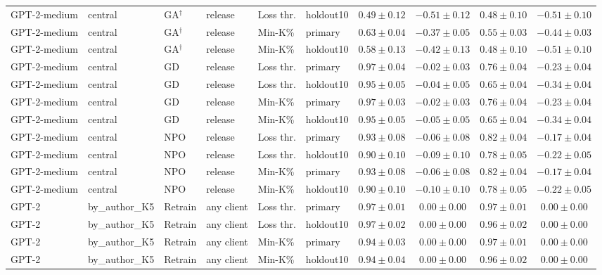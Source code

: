 {\begin{longtable}{@{\extracolsep{\fill}}llllllcccc@{}}
GPT-2-medium & central & GA$^{\dagger}$ & release & Loss thr. & holdout10 & $0.49 \pm 0.12$ & $-0.51 \pm 0.12$ & $0.48 \pm 0.10$ & $-0.51 \pm 0.10$ \\
GPT-2-medium & central & GA$^{\dagger}$ & release & Min-K\% & primary & $0.63 \pm 0.04$ & $-0.37 \pm 0.05$ & $0.55 \pm 0.03$ & $-0.44 \pm 0.03$ \\
GPT-2-medium & central & GA$^{\dagger}$ & release & Min-K\% & holdout10 & $0.58 \pm 0.13$ & $-0.42 \pm 0.13$ & $0.48 \pm 0.10$ & $-0.51 \pm 0.10$ \\
GPT-2-medium & central & GD & release & Loss thr. & primary & $0.97 \pm 0.04$ & $-0.02 \pm 0.03$ & $0.76 \pm 0.04$ & $-0.23 \pm 0.04$ \\
GPT-2-medium & central & GD & release & Loss thr. & holdout10 & $0.95 \pm 0.05$ & $-0.04 \pm 0.05$ & $0.65 \pm 0.04$ & $-0.34 \pm 0.04$ \\
GPT-2-medium & central & GD & release & Min-K\% & primary & $0.97 \pm 0.03$ & $-0.02 \pm 0.03$ & $0.76 \pm 0.04$ & $-0.23 \pm 0.04$ \\
GPT-2-medium & central & GD & release & Min-K\% & holdout10 & $0.95 \pm 0.05$ & $-0.05 \pm 0.05$ & $0.65 \pm 0.04$ & $-0.34 \pm 0.04$ \\
GPT-2-medium & central & NPO & release & Loss thr. & primary & $0.93 \pm 0.08$ & $-0.06 \pm 0.08$ & $0.82 \pm 0.04$ & $-0.17 \pm 0.04$ \\
GPT-2-medium & central & NPO & release & Loss thr. & holdout10 & $0.90 \pm 0.10$ & $-0.09 \pm 0.10$ & $0.78 \pm 0.05$ & $-0.22 \pm 0.05$ \\
GPT-2-medium & central & NPO & release & Min-K\% & primary & $0.93 \pm 0.08$ & $-0.06 \pm 0.08$ & $0.82 \pm 0.04$ & $-0.17 \pm 0.04$ \\
GPT-2-medium & central & NPO & release & Min-K\% & holdout10 & $0.90 \pm 0.10$ & $-0.10 \pm 0.10$ & $0.78 \pm 0.05$ & $-0.22 \pm 0.05$ \\
GPT-2 & by\_author\_K5 & Retrain & any client & Loss thr. & primary & $0.97 \pm 0.01$ & $0.00 \pm 0.00$ & $0.97 \pm 0.01$ & $0.00 \pm 0.00$ \\
GPT-2 & by\_author\_K5 & Retrain & any client & Loss thr. & holdout10 & $0.97 \pm 0.02$ & $0.00 \pm 0.00$ & $0.96 \pm 0.02$ & $0.00 \pm 0.00$ \\
GPT-2 & by\_author\_K5 & Retrain & any client & Min-K\% & primary & $0.94 \pm 0.03$ & $0.00 \pm 0.00$ & $0.97 \pm 0.01$ & $0.00 \pm 0.00$ \\
GPT-2 & by\_author\_K5 & Retrain & any client & Min-K\% & holdout10 & $0.94 \pm 0.04$ & $0.00 \pm 0.00$ & $0.96 \pm 0.02$ & $0.00 \pm 0.00$ \\

\end{longtable}}
